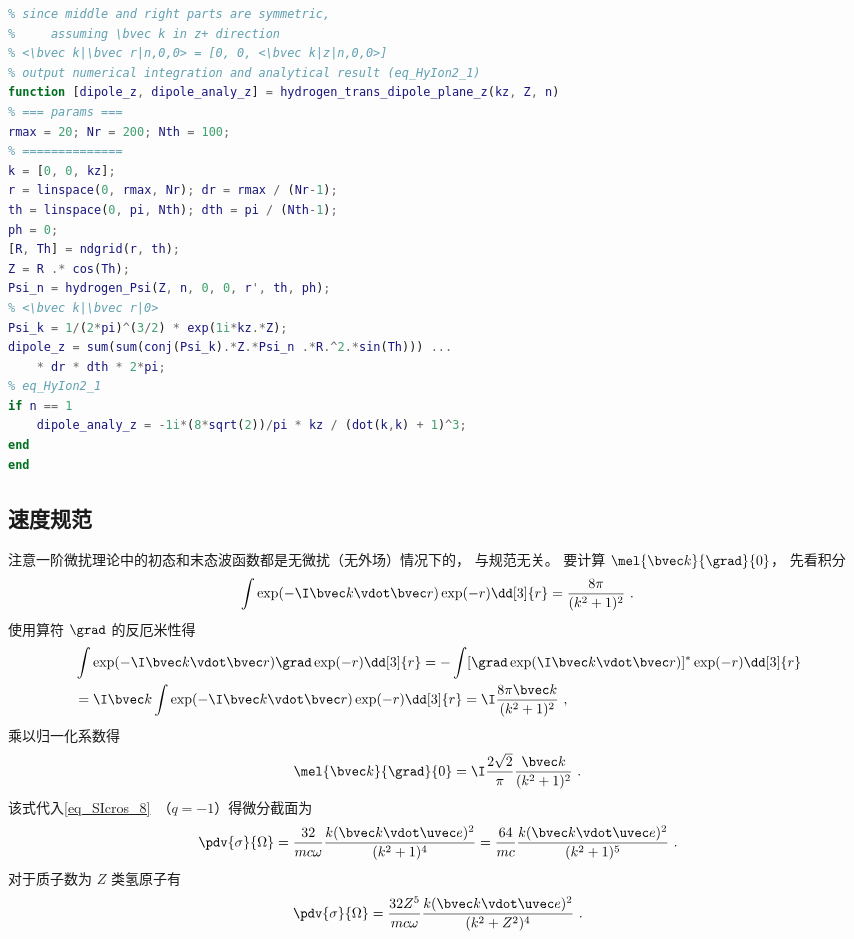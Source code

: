 \begin{lstlisting}[language=matlab, caption=hydrogen\_trans\_dipole\_plane\_z.m]
% hydrogen transition dipole, approximate Coulomb plane wave with plane wave
% since middle and right parts are symmetric,
%     assuming \bvec k in z+ direction
% <\bvec k|\bvec r|n,0,0> = [0, 0, <\bvec k|z|n,0,0>]
% output numerical integration and analytical result (eq_HyIon2_1)
function [dipole_z, dipole_analy_z] = hydrogen_trans_dipole_plane_z(kz, Z, n)
% === params ===
rmax = 20; Nr = 200; Nth = 100;
% ==============
k = [0, 0, kz];
r = linspace(0, rmax, Nr); dr = rmax / (Nr-1);
th = linspace(0, pi, Nth); dth = pi / (Nth-1);
ph = 0;
[R, Th] = ndgrid(r, th);
Z = R .* cos(Th);
Psi_n = hydrogen_Psi(Z, n, 0, 0, r', th, ph);
% <\bvec k|\bvec r|0>
Psi_k = 1/(2*pi)^(3/2) * exp(1i*kz.*Z);
dipole_z = sum(sum(conj(Psi_k).*Z.*Psi_n .*R.^2.*sin(Th))) ...
    * dr * dth * 2*pi;
% eq_HyIon2_1
if n == 1
    dipole_analy_z = -1i*(8*sqrt(2))/pi * kz / (dot(k,k) + 1)^3;
end
end
\end{lstlisting}


\subsection{速度规范}
注意一阶微扰理论中的初态和末态波函数都是无微扰（无外场）情况下的， 与规范无关。 要计算 $\mel{\bvec k}{\grad}{0}$， 先看积分
\begin{equation}
\int \exp(-\I \bvec k \vdot \bvec r) \exp(-r) \dd[3]{r} = \frac{8\pi }{(k^2 + 1)^2}~.
\end{equation}
使用算符 $\grad$ 的反厄米性得
\begin{equation}
\begin{aligned}
&\int \exp(-\I \bvec k \vdot \bvec r) \grad \exp(-r) \dd[3]{r}
= -\int [\grad \exp(\I \bvec k \vdot \bvec r)]^* \exp(-r) \dd[3]{r}\\
&= \I \bvec k \int \exp(-\I \bvec k \vdot \bvec r) \exp(-r) \dd[3]{r}
= \I \frac{8 \pi  \bvec k}{(k^2 + 1)^2}~,
\end{aligned}
\end{equation}
乘以归一化系数得
\begin{equation}\label{eq_HyIon2_2}
\mel{\bvec k}{\grad}{0} = \I\frac{2\sqrt{2}}{\pi}\frac{\bvec k}{(k^2 + 1)^2}~.
\end{equation}
该式代入\autoref{eq_SIcros_8}~（$q = -1$）得微分截面为
\begin{equation}
\pdv{\sigma}{\Omega} = \frac{32}{mc\omega} \frac{k(\bvec k \vdot \uvec e)^2}{(k^2 + 1)^4}
= \frac{64}{mc} \frac{k(\bvec k \vdot \uvec e)^2}{(k^2 + 1)^5}~.
\end{equation}
对于质子数为 $Z$ 类氢原子有
\begin{equation}
\pdv{\sigma}{\Omega} = \frac{32 Z^5}{mc\omega} \frac{k(\bvec k \vdot \uvec e)^2}{(k^2 + Z^2)^4}~.
\end{equation}

